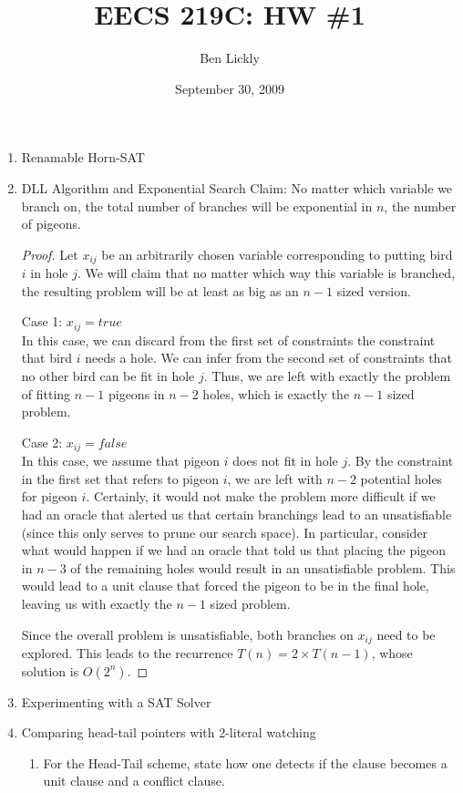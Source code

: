 \documentclass{amsart}
\title{EECS 219C: HW \#1}
\author{Ben Lickly}
\date{September 30, 2009}
\begin{document}
\begin{enumerate}
  \item Renamable Horn-SAT
  \item DLL Algorithm and Exponential Search
Claim: No matter which variable we branch on, the total number of branches
will be exponential in $n$, the number of pigeons.
\begin{proof}
Let $x_{ij}$ be an arbitrarily chosen variable corresponding to putting bird
$i$ in hole $j$.
We will claim that no matter which way this variable is branched, the
resulting problem will be at least as big as an $n-1$ sized version.

Case 1: $x_{ij} = true$ \\
In this case, we can discard from the first set of constraints
the constraint that bird $i$ needs a hole.
We can infer from the second set of constraints that no other bird
can be fit in hole $j$.
Thus, we are left with exactly the problem of fitting $n-1$ pigeons
in $n-2$ holes, which is exactly the $n-1$ sized problem.

Case 2: $x_{ij} = false$ \\
In this case, we assume that pigeon $i$ does not fit in hole $j$.
By the constraint in the first set that refers to pigeon $i$, we are left
with $n-2$ potential holes for pigeon $i$.
Certainly, it would not make the problem more difficult if we had an oracle
that alerted us that certain branchings lead to an unsatisfiable (since
this only serves to prune our search space).
In particular, consider what would happen if we had an oracle that
told us that placing the pigeon in $n-3$ of the remaining holes would result
in an unsatisfiable problem.
This would lead to a unit clause that forced the pigeon to be in the final
hole, leaving us with exactly the $n-1$ sized problem.

Since the overall problem is unsatisfiable, both branches on
$x_{ij}$ need to be explored.
This leads to the recurrence $T(n) = 2\times T(n-1)$,
whose solution is $O(2^n)$.
\end{proof}
  \item Experimenting with a SAT Solver
  \item Comparing head-tail pointers with 2-literal watching
    \begin{enumerate}
      \item For the Head-Tail scheme, state how one detects if the clause becomes a unit clause and a conflict clause.


\end{enumerate}
\end{enumerate}
\end{document}

